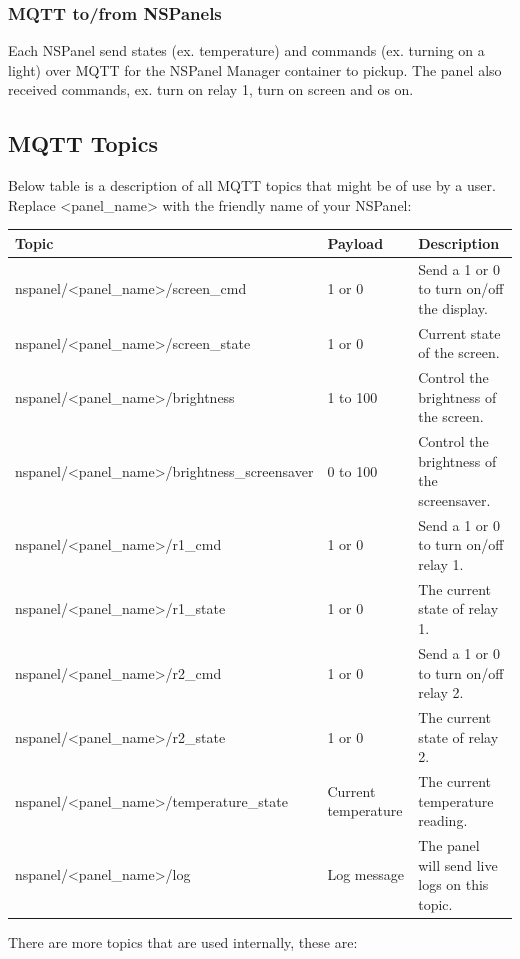 \documentclass[10pt]{article}
\begin{document}
    \subsubsection{MQTT to/from NSPanels}
    Each NSPanel send states (ex. temperature) and commands (ex. turning on a light) over MQTT for the NSPanel Manager container to pickup. The panel also received commands, ex. turn on relay 1, turn on screen and os on.

    \subsection{MQTT Topics}
    Below table is a description of all MQTT topics that might be of use by a user. Replace <panel\_name> with the friendly name of your NSPanel:
    \begin{table}[H]
    \begin{tabular}{|l|l|l|}
    \hline
    \textbf{Topic} & \textbf{Payload}  & \textbf{Description}  \\ \hline
    nspanel/<panel\_name>/screen\_cmd & 1 or 0 & Send a 1 or 0 to turn on/off the display. \\ \hline
    nspanel/<panel\_name>/screen\_state & 1 or 0 & Current state of the screen. \\ \hline
    nspanel/<panel\_name>/brightness & 1 to  100 & Control the brightness of the screen. \\ \hline
    nspanel/<panel\_name>/brightness\_screensaver & 0 to  100 & Control the brightness of the screensaver. \\ \hline
    nspanel/<panel\_name>/r1\_cmd & 1 or 0 & Send a 1 or 0 to turn on/off relay 1. \\ \hline
    nspanel/<panel\_name>/r1\_state & 1 or 0 & The current state of relay 1. \\ \hline
    nspanel/<panel\_name>/r2\_cmd & 1 or 0 & Send a 1 or 0 to turn on/off relay 2. \\ \hline
    nspanel/<panel\_name>/r2\_state & 1 or 0 & The current state of relay 2. \\ \hline
    nspanel/<panel\_name>/temperature\_state & Current temperature & The current temperature reading. \\ \hline
    nspanel/<panel\_name>/log & Log message & The panel will send live logs on this topic. \\ \hline
    \end{tabular}
    \end{table}

    There are more topics that are used internally, these are:
\end{document}
